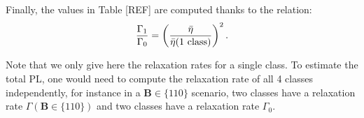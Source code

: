 \documentclass[a4paper,11pt]{report}
\begin{document}
Finally, the values in Table [REF] are computed thanks to the relation: \begin{equation}
\frac{\Gamma_1}{\Gamma_0}= \left(\frac{\bar \eta}{\bar \eta(\rm{1\ class})} \right)^2.
\end{equation}

Note that we only give here the relaxation rates for a single class. To estimate the total PL, one would need to compute the relaxation rate of all 4 classes independently, for instance in a $\mathbf{B} \in \{110\}$ scenario, two classes have a relaxation rate $\Gamma(\mathbf{B} \in \{110\})$ and two classes have a relaxation rate $\Gamma_0$.
\printbibliography
\end{document}
